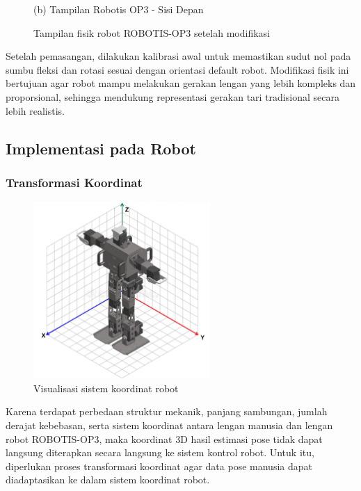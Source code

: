 \begin{figure}[H]
\begin{minipage}{0.48\textwidth}
        \caption*{(b) Tampilan Robotis OP3 - Sisi Depan}
    \end{minipage}
    \caption{Tampilan fisik robot ROBOTIS-OP3 setelah modifikasi}
    \label{fig:modifikasi_fisik}
\end{figure}


Setelah pemasangan, dilakukan kalibrasi awal untuk memastikan sudut nol pada sumbu fleksi dan rotasi sesuai dengan orientasi default robot. Modifikasi fisik ini bertujuan agar robot mampu melakukan gerakan lengan yang lebih kompleks dan proporsional, sehingga mendukung representasi gerakan tari tradisional secara lebih realistis.

\subsection{Implementasi pada Robot}
\subsubsection{Transformasi Koordinat}

\begin{figure}[H]
    \centering
    \includegraphics[width=0.6\textwidth]{images/mod_robot_coordinate.png}
    \caption{Visualisasi sistem koordinat robot}
    \label{fig:sistem_koordinat_robot}
\end{figure}

Karena terdapat perbedaan struktur mekanik, panjang sambungan, jumlah derajat kebebasan, serta sistem koordinat antara lengan manusia dan lengan robot ROBOTIS-OP3, maka koordinat 3D hasil estimasi pose tidak dapat langsung diterapkan secara langsung ke sistem kontrol robot. Untuk itu, diperlukan proses transformasi koordinat agar data pose manusia dapat diadaptasikan ke dalam sistem koordinat robot.

